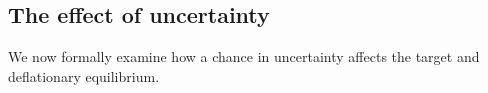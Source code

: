 \documentclass[11pt]{article}
\newtheorem{definition}{Definition}
\begin{document}
	
	
	\noindent
	
	\subsection{The effect of uncertainty}	
	
	We now formally examine how a chance in uncertainty affects the target and deflationary equilibrium. 
	
\end{document}
